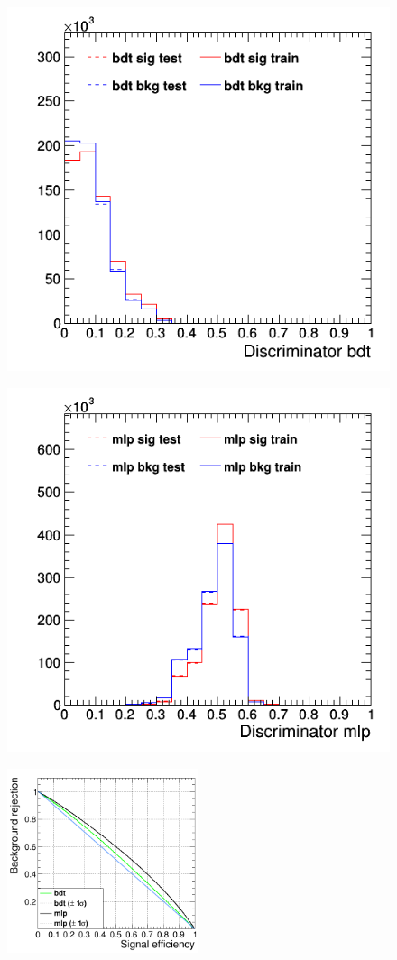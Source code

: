 \documentclass[11pt]{scrartcl}
\begin{document}
	\begin{figure}[H]
	\centering
	\begin{minipage}{.5\textwidth}
	  \centering
	  \includegraphics[width=0.75\linewidth]{figures/MVA/select1/config1/discriminator_bdt.png}
	  \label{fig:distr_s1_config1_bdt}
	\end{minipage}%
	\begin{minipage}{.5\textwidth}
	  \centering
	  \includegraphics[width=0.75\linewidth]{figures/MVA/select1/config1/discriminator_mlp.png}
	  \label{fig:distr_s1_config1_mlp}
	\end{minipage}
	\centering
	\includegraphics[width=0.5\textwidth]{figures/MVA/select1/config1/FOM_selection1_nL5_nT400_mD1_nC10.png}

\end{figure}
\end{document}
